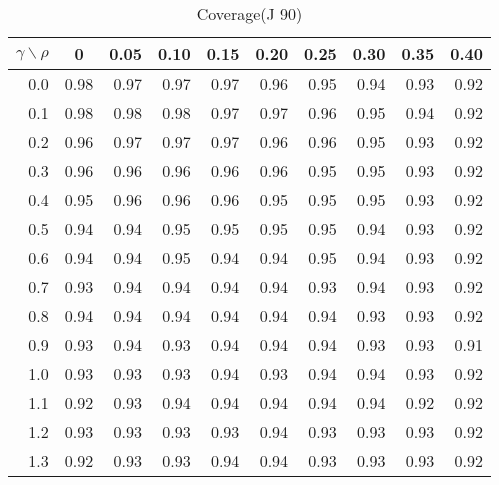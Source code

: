 \documentclass[12pt]{article}
\begin{document}
%
\begin{table}[!tbp]
\caption{Coverage(J 90)}
 \begin{center}
 \begin{tabular}{r|rrrrrrrrr}\hline\hline
\multicolumn{1}{c|}{$\gamma\backslash\rho$}&\multicolumn{1}{c}{0}&\multicolumn{1}{c}{0.05}&\multicolumn{1}{c}{0.10}&\multicolumn{1}{c}{0.15}&\multicolumn{1}{c}{0.20}&\multicolumn{1}{c}{0.25}&\multicolumn{1}{c}{0.30}&\multicolumn{1}{c}{0.35}&\multicolumn{1}{c}{0.40}\tabularnewline
\hline
0.0&0.98&0.97&0.97&0.97&0.96&0.95&0.94&0.93&0.92\tabularnewline
0.1&0.98&0.98&0.98&0.97&0.97&0.96&0.95&0.94&0.92\tabularnewline
0.2&0.96&0.97&0.97&0.97&0.96&0.96&0.95&0.93&0.92\tabularnewline
0.3&0.96&0.96&0.96&0.96&0.96&0.95&0.95&0.93&0.92\tabularnewline
0.4&0.95&0.96&0.96&0.96&0.95&0.95&0.95&0.93&0.92\tabularnewline
0.5&0.94&0.94&0.95&0.95&0.95&0.95&0.94&0.93&0.92\tabularnewline
0.6&0.94&0.94&0.95&0.94&0.94&0.95&0.94&0.93&0.92\tabularnewline
0.7&0.93&0.94&0.94&0.94&0.94&0.93&0.94&0.93&0.92\tabularnewline
0.8&0.94&0.94&0.94&0.94&0.94&0.94&0.93&0.93&0.92\tabularnewline
0.9&0.93&0.94&0.93&0.94&0.94&0.94&0.93&0.93&0.91\tabularnewline
1.0&0.93&0.93&0.93&0.94&0.93&0.94&0.94&0.93&0.92\tabularnewline
1.1&0.92&0.93&0.94&0.94&0.94&0.94&0.94&0.92&0.92\tabularnewline
1.2&0.93&0.93&0.93&0.93&0.94&0.93&0.93&0.93&0.92\tabularnewline
1.3&0.92&0.93&0.93&0.94&0.94&0.93&0.93&0.93&0.92\tabularnewline
\hline
\end{tabular}

\end{center}

\end{table}
\end{document}
